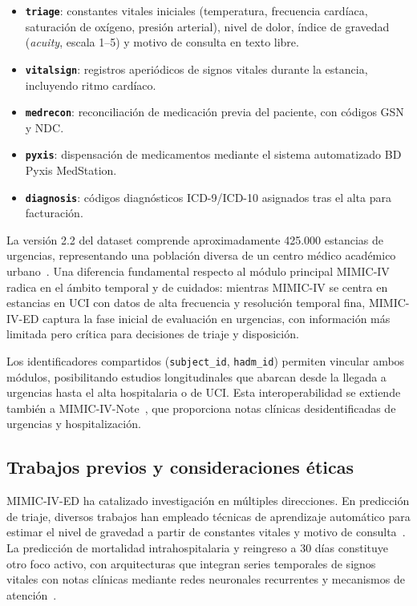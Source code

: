 \begin{itemize}[nosep, leftmargin=*]
    \item \textbf{\texttt{triage}}: constantes vitales iniciales (temperatura, frecuencia cardíaca, saturación de oxígeno, presión arterial), nivel de dolor, índice de gravedad (\textit{acuity}, escala 1--5) y motivo de consulta en texto libre.
    \item \textbf{\texttt{vitalsign}}: registros aperiódicos de signos vitales durante la estancia, incluyendo ritmo cardíaco.
    \item \textbf{\texttt{medrecon}}: reconciliación de medicación previa del paciente, con códigos GSN y NDC.
    \item \textbf{\texttt{pyxis}}: dispensación de medicamentos mediante el sistema automatizado BD Pyxis MedStation.
    \item \textbf{\texttt{diagnosis}}: códigos diagnósticos \ac{ICD}-9/\ac{ICD}-10 asignados tras el alta para facturación.
\end{itemize}

La versión 2.2 del dataset comprende aproximadamente 425.000 estancias de urgencias, representando una población diversa de un centro médico académico urbano~\parencite{johnson2023mimiciv}. Una diferencia fundamental respecto al módulo principal \ac{MIMIC}-IV radica en el ámbito temporal y de cuidados: mientras \ac{MIMIC}-IV se centra en estancias en \ac{UCI} con datos de alta frecuencia y resolución temporal fina, \acs{MIMIC}-IV-\acs{ED} captura la fase inicial de evaluación en urgencias, con información más limitada pero crítica para decisiones de triaje y disposición.

Los identificadores compartidos (\texttt{subject\_id}, \texttt{hadm\_id}) permiten vincular ambos módulos, posibilitando estudios longitudinales que abarcan desde la llegada a urgencias hasta el alta hospitalaria o de \ac{UCI}. Esta interoperabilidad se extiende también a \ac{MIMIC}-IV-Note~\parencite{johnson2023mimicivnote}, que proporciona notas clínicas desidentificadas de urgencias y hospitalización.

\subsection{Trabajos previos y consideraciones éticas}
\label{subsec:mimic-trabajos-etica}

\acs{MIMIC}-IV-\acs{ED} ha catalizado investigación en múltiples direcciones. En predicción de triaje, diversos trabajos han empleado técnicas de aprendizaje automático para estimar el nivel de gravedad a partir de constantes vitales y motivo de consulta~\parencite{park2024}. La predicción de mortalidad intrahospitalaria y reingreso a 30 días constituye otro foco activo, con arquitecturas que integran series temporales de signos vitales con notas clínicas mediante redes neuronales recurrentes y mecanismos de atención~\parencite{zhu2024emerge}.

